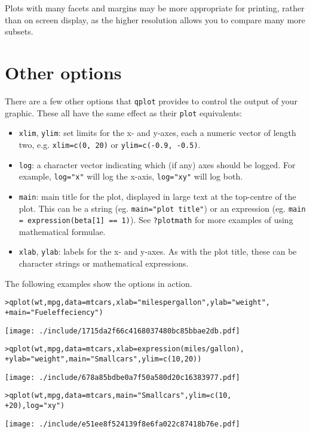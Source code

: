 Plots with many facets and margins may be more appropriate for printing, rather than on screen display, as the higher resolution allows you to compare many more subsets.

\section{Other options}\label{sec:other_options}

There are a few other options that {\tt qplot} provides to control the output of your graphic.  These all have the same effect as their {\tt plot} equivalents:

\begin{itemize}
	\item {\tt xlim}, {\tt ylim}: set limits for the x- and y-axes, each a numeric vector of length two, e.g. {\tt xlim=c(0, 20)} or {\tt ylim=c(-0.9, -0.5)}.
	\item {\tt log}: a character vector indicating which (if any) axes should be logged.  For example, {\tt log="x"} will log the x-axis, {\tt log="xy"} will log both.
	\item {\tt main}: main title for the plot, displayed in large text at the top-centre of the plot.  This can be a string (eg. {\tt main="plot title"}) or an expression (eg. {\tt main = expression(beta[1] == 1)}).  See {\tt ?plotmath} for more examples of using mathematical formulae.
	\item {\tt xlab}, {\tt ylab}: labels for the x- and y-axes.  As with the plot title, these can be character strings or mathematical expressions.
\end{itemize}

The following examples show the options in action.

\begin{alltt}
> qplot(wt, mpg, data = mtcars, xlab = "miles per gallon", ylab = "weight", 
+     main = "Fuel effeciency")
\end{alltt}
\texttt{[image: ./include/1715da2f66c4168037480bc85bbae2db.pdf]}
\begin{alltt}

> qplot(wt, mpg, data = mtcars, xlab = expression(miles/gallon), 
+     ylab = "weight", main = "Small cars", ylim = c(10, 20))
\end{alltt}
\texttt{[image: ./include/678a85bdbe0a7f50a580d20c16383977.pdf]}
\begin{alltt}

> qplot(wt, mpg, data = mtcars, main = "Small cars", ylim = c(10, 
+     20), log = "xy")
\end{alltt}
\texttt{[image: ./include/e51ee8f524139f8e6fa022c87418b76e.pdf]}
\begin{alltt}

\end{alltt}

